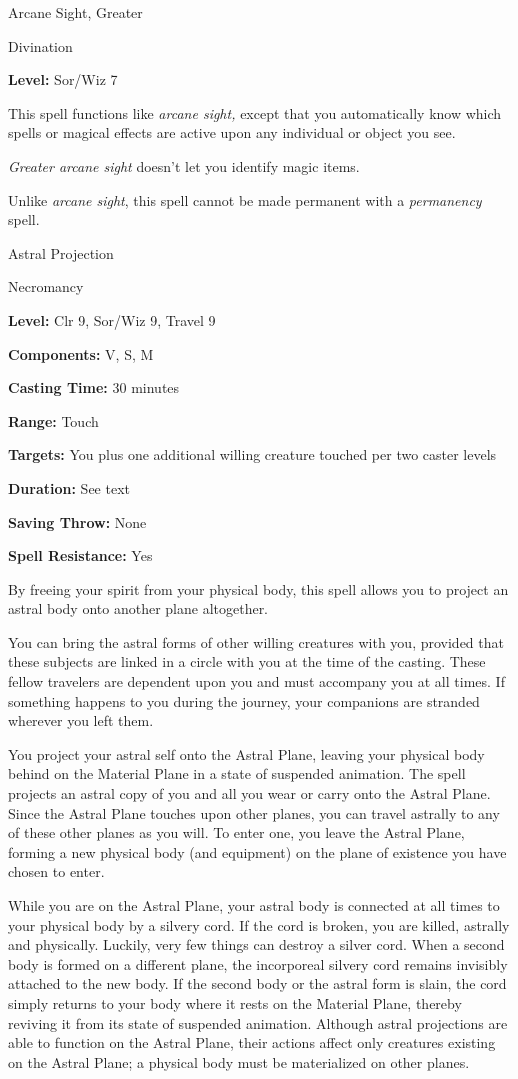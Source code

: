 \documentclass{article}
\begin{document}
\vspace{12pt}
Arcane Sight, Greater

Divination

\textbf{Level:} Sor/Wiz 7

This spell functions like \textit{arcane sight, }except that you automatically 
know which spells or magical effects are active upon any individual or object you 
see.

\textit{Greater arcane sight }doesn't let you identify magic items.

Unlike \textit{arcane sight}, this spell cannot be made permanent with a \textit{permanency 
}spell.

\vspace{12pt}
Astral Projection

Necromancy

\textbf{Level:} Clr 9, Sor/Wiz 9, Travel 9

\textbf{Components:} V, S, M

\textbf{Casting Time:} 30 minutes

\textbf{Range:} Touch

\textbf{Targets:} You plus one additional willing creature touched per two caster 
levels

\textbf{Duration:} See text

\textbf{Saving Throw:} None

\textbf{Spell Resistance:} Yes

By freeing your spirit from your physical body, this spell allows you to project 
an astral body onto another plane altogether.

You can bring the astral forms of other willing creatures with you, provided that 
these subjects are linked in a circle with you at the time of the casting. These 
fellow travelers are dependent upon you and must accompany you at all times. If 
something happens to you during the journey, your companions are stranded wherever 
you left them.

You project your astral self onto the Astral Plane, leaving your physical body 
behind on the Material Plane in a state of suspended animation. The spell projects 
an astral copy of you and all you wear or carry onto the Astral Plane. Since the 
Astral Plane touches upon other planes, you can travel astrally to any of these 
other planes as you will. To enter one, you leave the Astral Plane, forming a new 
physical body (and equipment) on the plane of existence you have chosen to enter.

While you are on the Astral Plane, your astral body is connected at all times to 
your physical body by a silvery cord. If the cord is broken, you are killed, astrally 
and physically. Luckily, very few things can destroy a silver cord. When a second 
body is formed on a different plane, the incorporeal silvery cord remains invisibly 
attached to the new body. If the second body or the astral form is slain, the cord 
simply returns to your body where it rests on the Material Plane, thereby reviving 
it from its state of suspended animation. Although astral projections are able 
to function on the Astral Plane, their actions affect only creatures existing on 
the Astral Plane; a physical body must be materialized on other planes.
\end{document}
